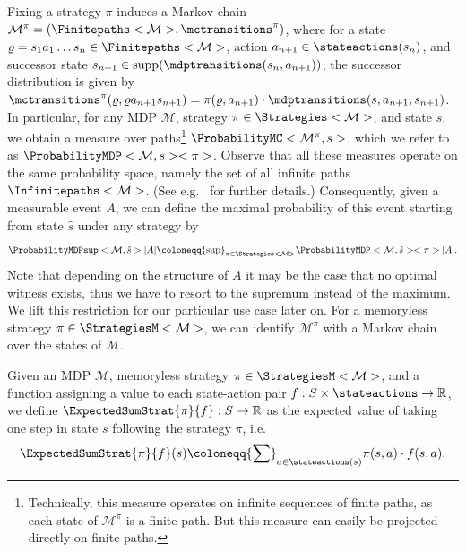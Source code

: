 \documentclass{theoretics}
\newcommand{\Reals}{\mathbb{R}}
\newcommand{\MDP}{\mathcal{M}}
\newcommand{\States}{S}
\newcommand{\initialstate}{\hat{s}}
\newcommand{\finitepath}{\varrho}
\newcommand{\strategy}{\pi}
\DeclareMathOperator{\support}{supp}
\begin{document}
Fixing a strategy $\strategy$ induces a Markov chain $\MDP^\strategy = (\Finitepaths<\MDP>, \mctransitions^\strategy)$, where for a state $\finitepath = s_1 a_1 \dots s_n \in \Finitepaths<\MDP>$, action $a_{n+1} \in \stateactions(s_n)$, and successor state $s_{n+1} \in \support(\mdptransitions(s_n, a_{n+1}))$, the successor distribution is given by $\mctransitions^\strategy(\finitepath, \finitepath a_{n+1} s_{n+1}) = \strategy(\finitepath, a_{n+1}) \cdot \mdptransitions(s, a_{n+1}, s_{n+1})$.
In particular, for any MDP $\MDP$, strategy $\strategy \in \Strategies<\MDP>$, and state $s$, we obtain a measure over paths\footnote{Technically, this measure operates on infinite sequences of finite paths, as each state of $\MDP^\strategy$ is a finite path.
But this measure can easily be projected directly on finite paths.}
$\ProbabilityMC<\MDP^\strategy, s>$, which we refer to as $\ProbabilityMDP<\MDP, s><\strategy>$.
Observe that all these measures operate on the same probability space, namely the set of all infinite paths $\Infinitepaths<\MDP>$.
(See e.g.\ \cite[Section~2.1.6]{DBLP:books/wi/Puterman94} for further details.)
Consequently, given a measurable event $A$, we can define the maximal probability of this event starting from state $\initialstate$ under any strategy by
\begin{equation*}
	\ProbabilityMDPsup<\MDP, \initialstate>[A] \coloneqq {\sup}_{\strategy \in \Strategies<\MDP>} \ProbabilityMDP<\MDP, \initialstate><\strategy>[A].
\end{equation*}
Note that depending on the structure of $A$ it may be the case that no optimal witness exists, thus we have to resort to the supremum instead of the maximum.
We lift this restriction for our particular use case later on.
For a memoryless strategy $\strategy \in \StrategiesM<\MDP>$, we can identify $\MDP^\strategy$ with a Markov chain over the states of $\MDP$.

Given an MDP $\MDP$, memoryless strategy $\strategy \in \StrategiesM<\MDP>$, and a function assigning a value to each state-action pair $f : \States \times \stateactions \to \Reals$, we define $\ExpectedSumStrat{\strategy}{f} : \States \to \Reals$ as the expected value of taking one step in state $s$ following the strategy $\strategy$, i.e.
\begin{equation*}
	\ExpectedSumStrat{\strategy}{f}(s) \coloneqq {\sum}_{a \in \stateactions(s)} \strategy(s, a) \cdot f(s, a).
\end{equation*}
\end{document}
